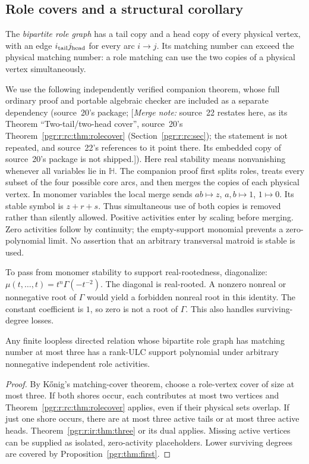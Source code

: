 \documentclass[11pt]{article}
\numberwithin{equation}{section}
\theoremstyle{definition}\newtheorem{definition}[theorem]{Definition}\newtheorem{remark}[theorem]{Remark}
\newcommand{\Ga}{\Gamma}                   %
\newcommand{\HH}{\mathbb H}                %
\newcommand{\mnote}[1]{[\textit{Merge note:} #1]}
\begin{document}
\subsection{Role covers and a structural corollary}\label{pgr:r:ir:sec:rolecover}
The \emph{bipartite role graph} has a tail copy and a head copy of every physical vertex, with an edge $i_{\rm tail}j_{\rm head}$ for every arc $i\to j$. Its matching number can exceed the physical matching number: a role matching can use the two copies of a physical vertex simultaneously.

We use the following independently verified companion theorem, whose full ordinary proof and portable algebraic checker are included as a separate dependency (source~20's package; \mnote{source~22 restates here, as its Theorem ``Two-tail/two-head cover'', source~20's Theorem~\ref{pgr:r:rc:thm:rolecover} (Section~\ref{pgr:r:rc:sec}); the statement is not repeated, and source~22's references to it point there. Its embedded copy of source~20's package is not shipped.}).
Here real stability means nonvanishing whenever all variables lie in $\HH$. The companion proof first splits roles, treats every subset of the four possible core arcs, and then merges the copies of each physical vertex. In monomer variables the local merge sends $ab\mapsto z$, $a,b\mapsto1$, $1\mapsto0$. Its stable symbol is $z+r+s$. Thus simultaneous use of both copies is removed rather than silently allowed. Positive activities enter by scaling before merging. Zero activities follow by continuity; the empty-support monomial prevents a zero-polynomial limit. No assertion that an arbitrary transversal matroid is stable is used.

To pass from monomer stability to support real-rootedness, diagonalize:
$\mu(t,\ldots,t)=t^n\Ga(-t^{-2})$. The diagonal is real-rooted. A nonzero nonreal or nonnegative root of $\Ga$ would yield a forbidden nonreal root in this identity. The constant coefficient is $1$, so zero is not a root of $\Ga$. This also handles surviving-degree losses.

\begin{corollary}\label{pgr:r:ir:cor:rolerank}
Any finite loopless directed relation whose bipartite role graph has matching number at most three has a rank-ULC support polynomial under arbitrary nonnegative independent role activities.
\end{corollary}
\begin{proof}
By K\H onig's matching-cover theorem, choose a role-vertex cover of size at most three. If both shores occur, each contributes at most two vertices and Theorem~\ref{pgr:r:rc:thm:rolecover} applies, even if their physical sets overlap. If just one shore occurs, there are at most three active tails or at most three active heads. Theorem~\ref{pgr:r:ir:thm:three} or its dual applies. Missing active vertices can be supplied as isolated, zero-activity placeholders. Lower surviving degrees are covered by Proposition~\ref{pgr:thm:first}.
\end{proof}
\end{document}

